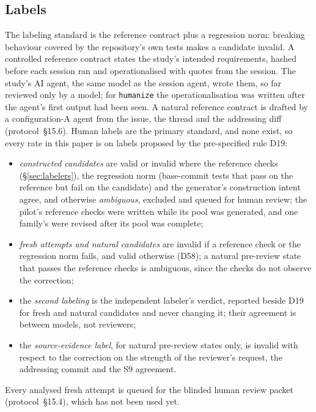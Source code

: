 \subsection{Labels}
\label{sec:labels}
The labeling standard is the reference contract plus a regression norm: breaking behaviour covered by the repository's own tests makes a candidate invalid. A controlled reference contract states the study's intended requirements, hashed before each session ran and operationalised with quotes from the session. The study's AI agent, the same model as the session agent, wrote them, so far reviewed only by a model; for \texttt{humanize} the operationalisation was written after the agent's first output had been seen. A natural reference contract is drafted by a configuration-A agent from the issue, the thread and the addressing diff (protocol~\S15.6). Human labels are the primary standard, and none exist, so every rate in this paper is on labels proposed by the pre-specified rule D19:
\begin{itemize}
\item \emph{constructed candidates} are valid or invalid where the reference checks (\S\ref{sec:labelers}), the regression norm (base-commit tests that pass on the reference but fail on the candidate) and the generator's construction intent agree, and otherwise \emph{ambiguous}, excluded and queued for human review; the pilot's reference checks were written while its pool was generated, and one family's were revised after its pool was complete;
\item \emph{fresh attempts and natural candidates} are invalid if a reference check or the regression norm fails, and valid otherwise (D58); a natural pre-review state that passes the reference checks is ambiguous, since the checks do not observe the correction;
\item the \emph{second labeling} is the independent labeler's verdict, reported beside D19 for fresh and natural candidates and never changing it; their agreement is between models, not reviewers;
\item the \emph{source-evidence label}, for natural pre-review states only, is invalid with respect to the correction on the strength of the reviewer's request, the addressing commit and the S9 agreement.
\end{itemize}
Every analysed fresh attempt is queued for the blinded human review packet (protocol~\S15.4), which has not been used yet.

